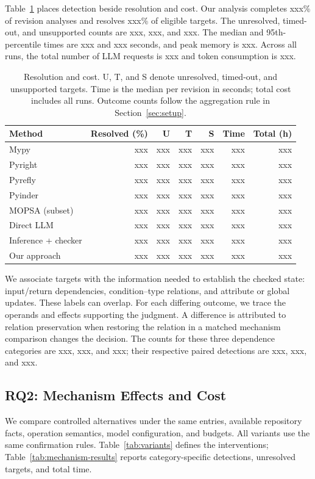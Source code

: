 Table~\ref{tab:resolution} places detection beside resolution and cost.
Our analysis completes xxx\% of revision analyses and resolves xxx\%
of eligible targets. The unresolved, timed-out, and unsupported counts
are xxx, xxx, and xxx. The median and 95th-percentile times are xxx and
xxx seconds, and peak memory is xxx. Across all runs, the total number
of LLM requests is xxx and token consumption is xxx.

\begin{table}[t]
\centering
\small
\setlength{\tabcolsep}{3pt}
\caption{Resolution and cost. U, T, and S denote unresolved, timed-out, and unsupported targets. Time is the median per revision in seconds; total cost includes all runs. Outcome counts follow the aggregation rule in Section~\ref{sec:setup}.}
\label{tab:resolution}
\begin{tabular}{lrrrrrr}
\toprule
Method & Resolved (\%) & U & T & S & Time & Total (h)\\
\midrule
Mypy & xxx & xxx & xxx & xxx & xxx & xxx\\
Pyright & xxx & xxx & xxx & xxx & xxx & xxx\\
Pyrefly & xxx & xxx & xxx & xxx & xxx & xxx\\
Pyinder & xxx & xxx & xxx & xxx & xxx & xxx\\
MOPSA (subset) & xxx & xxx & xxx & xxx & xxx & xxx\\
Direct LLM & xxx & xxx & xxx & xxx & xxx & xxx\\
Inference + checker & xxx & xxx & xxx & xxx & xxx & xxx\\
Our approach & xxx & xxx & xxx & xxx & xxx & xxx\\
\bottomrule
\end{tabular}
\end{table}

We associate targets with the information needed to establish the checked
state: input/return dependencies, condition--type relations, and attribute
or global updates. These labels can overlap. For each differing outcome,
we trace the operands and effects supporting the judgment. A difference
is attributed to relation preservation when restoring the relation in a
matched mechanism comparison changes the decision. The counts for these
three dependence categories are xxx, xxx, and xxx; their respective paired
detections are xxx, xxx, and xxx.

\subsection{RQ2: Mechanism Effects and Cost}
\label{sec:rq2}
We compare controlled alternatives under the same entries, available
repository facts, operation semantics, model configuration, and budgets.
All variants use the same confirmation rules. Table~\ref{tab:variants}
defines the interventions; Table~\ref{tab:mechanism-results} reports
category-specific detections, unresolved targets, and total time.

